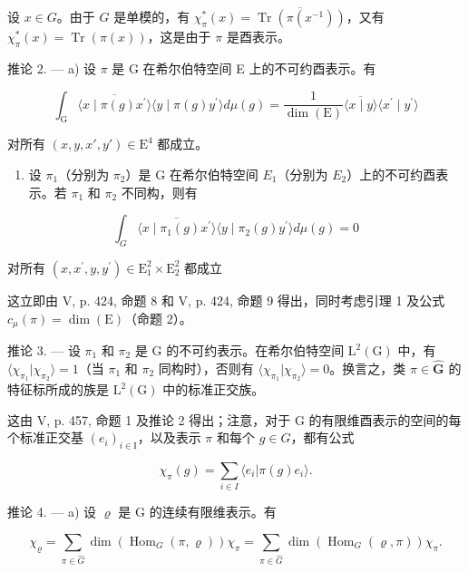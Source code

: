 设 \(x \in G\)。由于 \(G\) 是单模的，有 \(\chi_{\pi}^{*}(x) = \overline{\operatorname{Tr}(\pi(x^{-1}))}\)，又有 \(\chi_{\pi}^{*}(x) = \operatorname{Tr}(\pi(x))\)，这是由于 \(\pi\) 是酉表示。

推论 2. --- a) 设 \(\pi\) 是 G 在希尔伯特空间 E 上的不可约酉表示。有

\[
\int_ {\mathrm{G}} \overline {{\langle x \mid \pi (g) x ^ {\prime} \rangle}} \langle y \mid \pi (g) y ^ {\prime} \rangle d \mu (g) = \frac {1}{\dim (\mathrm{E})} \overline {{\langle x \mid y \rangle}} \langle x ^ {\prime} \mid y ^ {\prime} \rangle
\]

对所有 \((x,y,x',y')\in \mathrm{E}^4\) 都成立。

\begin{enumerate}
\def\labelenumi{\alph{enumi})}
\setcounter{enumi}{1}
\tightlist
\item
  设 \(\pi_{1}\)（分别为 \(\pi_{2}\)）是 G 在希尔伯特空间 \(E_{1}\)（分别为 \(E_{2}\)）上的不可约酉表示。若 \(\pi_{1}\) 和 \(\pi_{2}\) 不同构，则有
\end{enumerate}

\[
\int_ {G} \overline {{\langle x \mid \pi_ {1} (g) x ^ {\prime} \rangle}} \langle y \mid \pi_ {2} (g) y ^ {\prime} \rangle d \mu (g) = 0
\]

对所有 \((x,x^{\prime},y,y^{\prime})\in \mathrm{E}_{1}^{2}\times \mathrm{E}_{2}^{2}\) 都成立

这立即由 V, p. 424, 命题 8 和 V, p. 424, 命题 9 得出，同时考虑引理 1 及公式 \(c_{\mu}(\pi) = \dim(\mathrm{E})\)（命题 2）。

推论 3. --- 设 \(\pi_1\) 和 \(\pi_2\) 是 G 的不可约表示。在希尔伯特空间 \(\mathrm{L}^{2}(\mathrm{G})\) 中，有 \(\langle \chi_{\pi_1} | \chi_{\pi_2} \rangle = 1\)（当 \(\pi_1\) 和 \(\pi_2\) 同构时），否则有 \(\langle \chi_{\pi_1} | \chi_{\pi_2} \rangle = 0\)。换言之，类 \(\pi \in \widehat{\mathbf{G}}\) 的特征标所成的族是 \(\mathrm{L}^{2}(\mathrm{G})\) 中的标准正交族。

这由 V, p. 457, 命题 1 及推论 2 得出；注意，对于 G 的有限维酉表示的空间的每个标准正交基 \((e_{i})_{i\in\mathrm{I}}\)，以及表示 \(\pi\) 和每个 \(g\in G\)，都有公式

\[
\chi_ {\pi} (g) = \sum_ {i \in I} \langle e _ {i} | \pi (g) e _ {i} \rangle .
\]

推论 4. --- a) 设 \(\varrho\) 是 G 的连续有限维表示。有

\[
\chi_ {\varrho} = \sum_ {\pi \in \widehat {G}} \dim (\operatorname{Hom} _ {G} (\pi , \varrho)) \chi_ {\pi} = \sum_ {\pi \in \widehat {G}} \dim (\operatorname{Hom} _ {G} (\varrho , \pi)) \chi_ {\pi}.
\]

